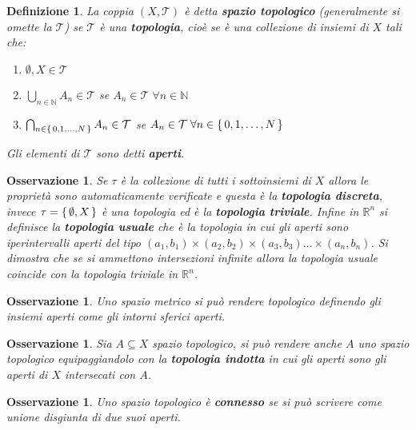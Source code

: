 \documentclass[10pt, twoside=false, x11names]{scrbook}
\newtheorem{osservation}[theorem]{Osservazione}
\newtheorem{definition}[theorem]{Definizione}
\newcommand{\RN}[1][]{\mathbb{R}^#1}
\begin{document}
\begin{definition}
  La coppia $ (X, \mathcal{T}) $ è detta \textbf{spazio topologico}
  (generalmente si omette la $ \mathcal{T} $)
  se $ \mathcal{T} $ è una \textbf{topologia}, cioè se è una collezione di insiemi di $ X $ tali che:
  \begin{enumerate}
  \item $ \emptyset, X \in \mathcal{T} $
  \item $ \bigcup_{n \in \mathbb{N}} A_n \in \mathcal{T} $ se $ A_n \in \mathcal{T} \; \forall n \in \mathbb{N} $
  \item $ \bigcap_{n \in \set{0,1,\dots,N} } A_n \in \mathcal{T} $ se $ A_n \in \mathcal{T} \; \forall n \in \set{0,1,\dots,N} $
  \end{enumerate}
  Gli elementi di $ \mathcal{T} $ sono detti \textbf{aperti}.
\end{definition}
\begin{osservation}
  Se $ \tau $ è la collezione di tutti i sottoinsiemi di $ X $ allora le proprietà sono automaticamente
  verificate e questa è la \textbf{topologia discreta}, invece
  $ \tau = \set{\emptyset, X} $ è una topologia ed è la \textbf{topologia triviale}.
  Infine in $ \RN{n} $ si definisce la \textbf{topologia usuale} che è la topologia in cui gli aperti
  sono iperintervalli aperti del tipo $ (a_1,b_1) \times (a_2, b_2) \times (a_3, b_3) \dots \times (a_n, b_n) $.
  Si dimostra che se si ammettono intersezioni infinite allora la topologia usuale coincide con la topologia
  triviale in $ \RN{n} $.
\end{osservation}

\begin{osservation}
  Uno spazio metrico si può rendere topologico definendo gli insiemi aperti come gli intorni sferici aperti.
\end{osservation}

\begin{osservation}
  Sia $ A \subseteq X $ spazio topologico, si può rendere anche $ A $ uno spazio topologico equipaggiandolo con la
  \textbf{topologia indotta} in cui gli aperti sono gli aperti di $ X $ intersecati
  con $ A $.
\end{osservation}

\begin{osservation}
  Uno spazio topologico è \textbf{connesso} se si può scrivere come
  unione disgiunta di due suoi aperti.
\end{osservation}
\end{document}
